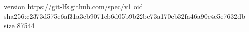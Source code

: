 version https://git-lfs.github.com/spec/v1
oid sha256:c2373d575e6af31a3cb9071cb6d05b9b22bc73a170eb32fa46a90e4c5e7632db
size 87544
